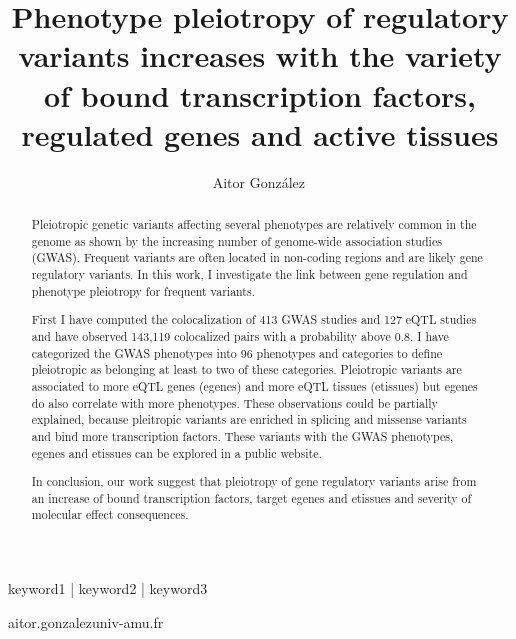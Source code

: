 
\title{Phenotype pleiotropy of regulatory variants increases with the variety of bound transcription factors, regulated genes and active tissues}

\author[1,*]{Aitor González\,}

\date{}

\maketitle

\begin{abstract}

Pleiotropic genetic variants affecting several phenotypes are relatively common in the genome as shown by the increasing number of genome-wide association studies (GWAS).
%
Frequent variants are often located in non-coding regions and are likely gene regulatory variants.
%
In this work, I investigate the link between gene regulation and phenotype pleiotropy for frequent variants.

First I have computed the colocalization of 413 GWAS studies and 127 eQTL studies and have observed 143,119 colocalized pairs with a probability above 0.8.
%
I have categorized the GWAS phenotypes into 96 phenotypes and categories to define pleiotropic as belonging at least to two of these categories.
%
Pleiotropic variants are associated to more eQTL genes (egenes) and more eQTL tissues (etissues) but egenes do also correlate with more phenotypes.
%
These observations could be partially explained, because pleitropic variants are enriched in splicing and missense variants and bind more transcription factors.
%
These variants with the GWAS phenotypes, egenes and etissues can be explored in a public website.

In conclusion, our work suggest that pleiotropy of gene regulatory variants arise from an increase of bound transcription factors, target egenes and etissues and severity of molecular effect consequences.

\end{abstract}

\begin{keywords}
keyword1 | keyword2 | keyword3
\end{keywords}

\begin{corrauthor}
aitor.gonzalez\at univ-amu.fr
\end{corrauthor}

